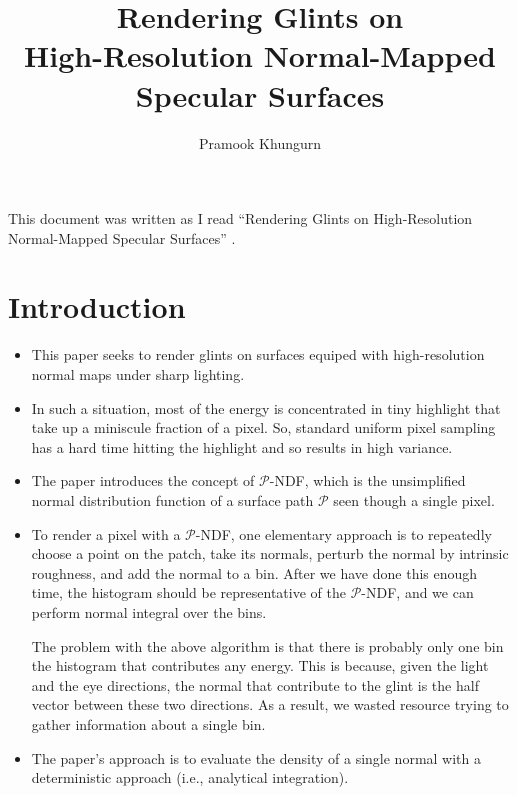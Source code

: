 \documentclass[10pt]{article}
\title{Rendering Glints on\\High-Resolution Normal-Mapped Specular Surfaces}
\author{Pramook Khungurn}
\begin{document}
  \maketitle

  This document was written as I read ``Rendering Glints on High-Resolution Normal-Mapped Specular Surfaces'' \cite{Yan:2014}.

  \section{Introduction} %
  \label{sec:introduction}
  
  \begin{itemize}
  	\item This paper seeks to render glints on surfaces equiped with high-resolution normal maps under sharp lighting.

  	\item In such a situation, most of the energy is concentrated in tiny highlight that take up a miniscule fraction of a pixel.  So, standard uniform pixel sampling has a hard time hitting the highlight and so results in high variance.

  	\item The paper introduces the concept of $\mathcal{P}$-NDF, which is the unsimplified normal distribution function of a surface path $\mathcal{P}$ seen though a single pixel.

  	\item To render a pixel with a $\mathcal{P}$-NDF, one elementary approach is to repeatedly choose a point on the patch, take its normals, perturb the normal by intrinsic roughness, and add the normal to a bin.  After we have done this enough time, the histogram should be representative of the $\mathcal{P}$-NDF, and we can perform normal integral over the bins.

  	The problem with the above algorithm is that there is probably only one bin the histogram that contributes any energy.  This is because, given the light and the eye directions, the normal that contribute to the glint is the half vector between these two directions. As a result, we wasted resource trying to gather information about a single bin.

  	\item The paper's approach is to evaluate the density of a single normal with a deterministic approach (i.e., analytical integration).
  \end{itemize}  
\end{document}
